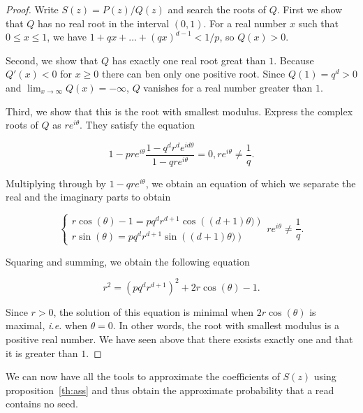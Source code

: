 \documentclass{article}
\begin{document}
\begin{proof}
Write $S(z) = P(z)/Q(z)$ and search the roots of $Q$. First we show that
$Q$ has no real root in the interval $(0,1)$. For a real number $x$ such
that $0\leq x \leq 1$, we have $1+qx+\ldots+(qx)^{d-1} < 1/p$, so $Q(x) >
0$.

Second, we show that $Q$ has exactly one real root great than $1$. Because
$Q'(x) < 0$ for $x \geq 0$ there can ben only one positive root.  Since
$Q(1) = q^d > 0$ and $\lim_{x\rightarrow \infty} Q(x) = -\infty$, $Q$
vanishes for a real number greater than $1$.

Third, we show that this is the root with smallest modulus.  Express the
complex roots of $Q$ as $re^{i\theta}$. They satisfy the equation

\begin{equation*}
1-pre^{i\theta}\frac{1-q^dr^de^{id\theta}}{1-qre^{i\theta}} = 0,
re^{i\theta} \neq \frac{1}{q}.
\end{equation*}

Multiplying through by $1-qre^{i\theta}$, we obtain an equation of which
we separate the real and the imaginary parts to obtain

\begin{equation*}
\left\{
\begin{array}{ll}
r \cos (\theta) -1 = pq^dr^{d+1} \cos \left( (d+1) \theta) \right) \\
r \sin (\theta) = pq^dr^{d+1} \sin \left( (d+1) \theta) \right)
\end{array}
\right. re^{i\theta} \neq \frac{1}{q}.
\end{equation*}

Squaring and summing, we obtain the following equation

\begin{equation*}
r^2 = (pq^dr^{d+1})^2 + 2r \cos(\theta) -1.
\end{equation*}

Since $r > 0$, the solution of this equation is minimal when
$2r\cos(\theta)$ is maximal, \textit{i.e.} when $\theta = 0$. In other
words, the root with smallest modulus is a positive real number. We have
seen above that there exsists exactly one and that it is greater than $1$.
\end{proof}


We can now have all the tools to approximate the coefficients of $S(z)$
using proposition~\ref{th:ass} and thus obtain the approximate probability
that a read contains no seed.
\end{document}

